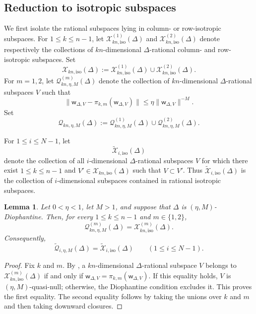 \documentclass[reqno,11pt]{amsart}
\numberwithin{equation}{section}
\newtheorem{lemma}[theorem]{Lemma}
\theoremstyle{definition}
\theoremstyle{remark}
\begin{document}
\subsection{Reduction to isotropic subspaces}

We first isolate the rational subspaces lying in column- or row-isotropic
subspaces. For $1\le k\le n-1$, let
$\mathcal X^{(1)}_{kn,\mathrm{iso}}(\Delta)$ and
$\mathcal X^{(2)}_{kn,\mathrm{iso}}(\Delta)$ denote respectively the
collections of $kn$-dimensional $\Delta$-rational column- and
row-isotropic subspaces. Set
$$
\mathcal X_{kn,\mathrm{iso}}(\Delta)
:=
\mathcal X^{(1)}_{kn,\mathrm{iso}}(\Delta)
\cup
\mathcal X^{(2)}_{kn,\mathrm{iso}}(\Delta).
$$
For $m=1,2$, let
$\mathscr Q^{(m)}_{kn,\eta,M}(\Delta)$ denote the collection of
$kn$-dimensional $\Delta$-rational subspaces $V$ such that
$$
\|\mathsf w_{\Delta,V}-\pi_{k,m}(\mathsf w_{\Delta,V})\|
\le
\eta\|\mathsf w_{\Delta,V}\|^{-M}.
$$
Set
$$
\mathscr Q_{kn,\eta,M}(\Delta)
:=
\mathscr Q^{(1)}_{kn,\eta,M}(\Delta)
\cup
\mathscr Q^{(2)}_{kn,\eta,M}(\Delta).
$$

For $1\le i\le N-1$, let
$$
\widetilde{\mathcal X}_{i,\mathrm{iso}}(\Delta)
$$
denote the collection of all $i$-dimensional $\Delta$-rational
subspaces $V$ for which there exist $1\le k\le n-1$ and
$V'\in\mathcal X_{kn,\mathrm{iso}}(\Delta)$ such that $V\subset V'$. Thus
$\widetilde{\mathcal X}_{i,\mathrm{iso}}(\Delta)$ is the
collection of $i$-dimensional subspaces contained in rational isotropic
subspaces.

\begin{lemma}\label{lem:quasinull-isotropic}
Let $0<\eta<1$, let $M>1$, and suppose that $\Delta$ is
$(\eta,M)$-Diophantine. Then, for every $1\le k\le n-1$ and
$m\in\{1,2\}$,
$$
\mathscr Q^{(m)}_{kn,\eta,M}(\Delta)
=
\mathcal X^{(m)}_{kn,\mathrm{iso}}(\Delta).
$$
Consequently,
$$
\widetilde{\mathscr Q}_{i,\eta,M}(\Delta)
=
\widetilde{\mathcal X}_{i,\mathrm{iso}}(\Delta)
\qquad (1\le i\le N-1).
$$
\end{lemma}



\begin{proof}
Fix $k$ and $m$. By
, a $kn$-dimensional
$\Delta$-rational subspace $V$ belongs to
$\mathcal X^{(m)}_{kn,\mathrm{iso}}(\Delta)$ if and only if
$
\mathsf w_{\Delta,V}
=
\pi_{k,m}(\mathsf w_{\Delta,V}).
$
If this equality holds, $V$ is $(\eta,M)$-quasi-null; otherwise, the
Diophantine condition excludes it. This proves the first equality. The second equality follows by taking the unions over $k$ and $m$ and
then taking downward closures.
\end{proof}
\end{document}
